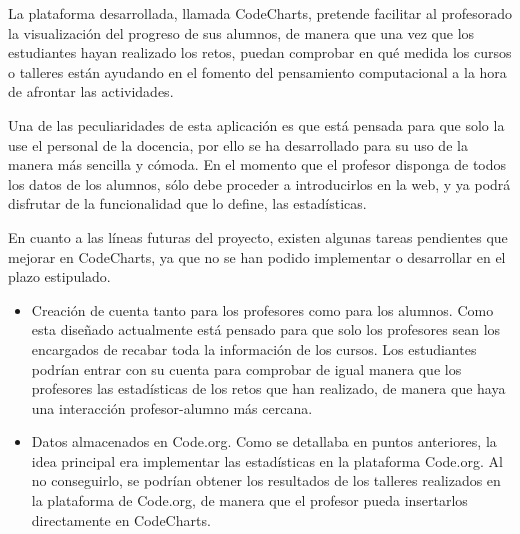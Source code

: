 

La plataforma desarrollada, llamada CodeCharts, pretende facilitar al profesorado la visualización del progreso de sus alumnos, de manera que una vez que los estudiantes hayan realizado los retos, puedan comprobar en qué medida los cursos
o talleres están ayudando en el fomento del pensamiento computacional a la hora de afrontar las actividades.

Una de las peculiaridades de esta aplicación es que está pensada para que solo la use el personal de la docencia, por ello se ha desarrollado para su uso de la manera más sencilla y cómoda. En el momento que el profesor disponga de todos los datos de los alumnos,
sólo debe proceder a introducirlos en la web, y ya podrá disfrutar de la funcionalidad que lo define, las estadísticas.

En cuanto a las líneas futuras del proyecto, existen algunas tareas pendientes que mejorar en CodeCharts, ya que no se han podido implementar o desarrollar en el plazo estipulado.

\begin{itemize}
    \item Creación de cuenta tanto para los profesores como para los alumnos. Como esta diseñado actualmente está pensado para que solo los profesores sean los encargados de recabar toda la información de los cursos. Los estudiantes podrían entrar
    con su cuenta para comprobar de igual manera que los profesores las estadísticas de los retos que han realizado, de manera que haya una interacción profesor-alumno más cercana.
    \item Datos almacenados en Code.org. Como se detallaba en puntos anteriores, la idea principal era implementar las estadísticas en la plataforma Code.org. Al no conseguirlo, se podrían obtener los resultados de los talleres realizados en la plataforma de Code.org, 
    de manera que el profesor pueda insertarlos directamente en CodeCharts.
\end{itemize}




